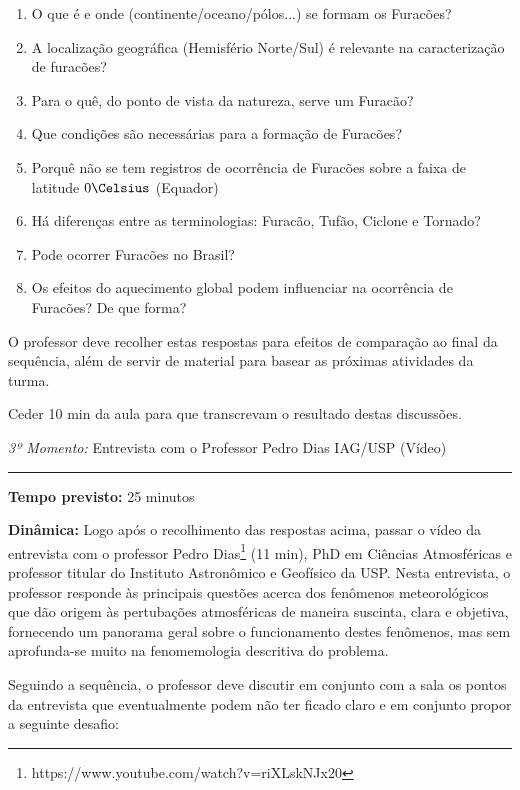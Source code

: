 \documentclass[
12pt,				%
openright,			%
oneside,			%
a4paper,			%
chapter=TITLE,		%
english,			%
brazil				%
]{abntex2}
\begin{document}
\begin{enumerate}[label=\alph *)]
		\item O que é e onde (continente/oceano/pólos...) se formam os Furacões?
		\item A localização geográfica (Hemisfério Norte/Sul) é relevante na caracterização de furacões?
		\item Para o quê, do ponto de vista da natureza, serve um Furacão?
		\item Que condições são necessárias para a formação de Furacões?
		\item Porquê não se tem registros de ocorrência de Furacões sobre a faixa de latitude $0\Celsius$ (Equador)
		\item Há diferenças entre as terminologias: Furacão, Tufão, Ciclone e Tornado?
		\item Pode ocorrer Furacões no Brasil?
		\item Os efeitos do aquecimento global podem influenciar na ocorrência de Furacões? De que forma? 
\end{enumerate}

O professor deve recolher estas respostas para efeitos de comparação ao final da sequência, além de servir de material para basear as próximas atividades da turma. 

Ceder 10 min da aula para que transcrevam o resultado destas discussões.


\vspace{50pt}
\noindent\emph{3º Momento:} Entrevista com o Professor Pedro Dias IAG/USP (Vídeo)
\par\noindent\rule{.3\textwidth}{.5pt}
\par\noindent\textbf{Tempo previsto:} 25 minutos
\par\noindent\textbf{Dinâmica:} Logo após o recolhimento das respostas acima, passar o vídeo da entrevista com o professor Pedro Dias\footnote{https://www.youtube.com/watch?v=riXLskNJx20} (11 min), PhD em Ciências Atmosféricas e professor titular do Instituto Astronômico e Geofísico da USP. Nesta entrevista, o professor responde às principais questões acerca dos fenômenos meteorológicos que dão origem às pertubações atmosféricas de maneira suscinta, clara e objetiva, fornecendo um panorama geral sobre o funcionamento destes fenômenos, mas sem aprofunda-se muito na fenomemologia descritiva do problema.

Seguindo a sequência, o professor deve discutir em conjunto com a sala os pontos da entrevista que eventualmente podem não ter ficado claro e em conjunto propor a seguinte desafio:
\end{document}
